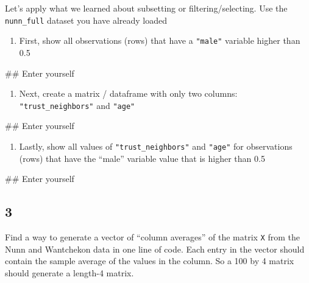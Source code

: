 \documentclass[]{book}
\newenvironment{Shaded}{\begin{snugshade}}{\end{snugshade}}
\newcommand{\NormalTok}[1]{#1}
\providecommand{\tightlist}{%
  \setlength{\itemsep}{0pt}\setlength{\parskip}{0pt}}
\theoremstyle{definition}
\theoremstyle{definition}
\theoremstyle{definition}
\theoremstyle{remark}
\begin{document}
Let's apply what we learned about subsetting or filtering/selecting. Use
the \texttt{nunn\_full} dataset you have already loaded

\begin{enumerate}
\def\labelenumi{\alph{enumi})}
\tightlist
\item
  First, show all observations (rows) that have a \texttt{"male"}
  variable higher than 0.5
\end{enumerate}

\begin{Shaded}
\begin{Highlighting}[]
\NormalTok{## Enter yourself}
\end{Highlighting}
\end{Shaded}

\begin{enumerate}
\def\labelenumi{\alph{enumi})}
\setcounter{enumi}{1}
\tightlist
\item
  Next, create a matrix / dataframe with only two columns:
  \texttt{"trust\_neighbors"} and \texttt{"age"}
\end{enumerate}

\begin{Shaded}
\begin{Highlighting}[]
\NormalTok{## Enter yourself}
\end{Highlighting}
\end{Shaded}

\begin{enumerate}
\def\labelenumi{\alph{enumi})}
\setcounter{enumi}{2}
\tightlist
\item
  Lastly, show all values of \texttt{"trust\_neighbors"} and
  \texttt{"age"} for observations (rows) that have the ``male'' variable
  value that is higher than 0.5
\end{enumerate}

\begin{Shaded}
\begin{Highlighting}[]
\NormalTok{## Enter yourself}
\end{Highlighting}
\end{Shaded}

\subsection*{3}\label{section-11}

Find a way to generate a vector of ``column averages'' of the matrix
\texttt{X} from the Nunn and Wantchekon data in one line of code. Each
entry in the vector should contain the sample average of the values in
the column. So a 100 by 4 matrix should generate a length-4 matrix.
\end{document}
